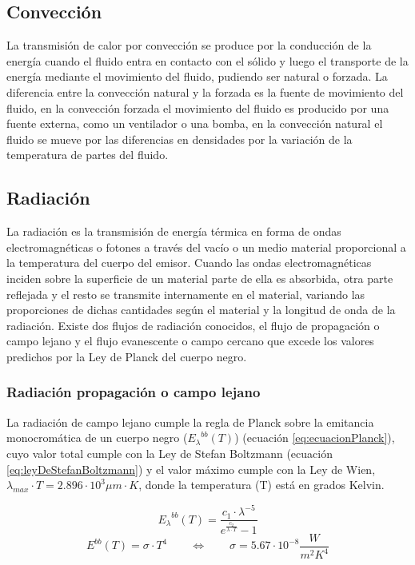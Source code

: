 \subsection{Convección}
La transmisión de calor por convección se produce por la conducción de la energía cuando el fluido entra en contacto con el sólido y luego el transporte de la energía mediante el movimiento del fluido, pudiendo ser natural o forzada. La diferencia entre la convección natural y la forzada es la fuente de movimiento del fluido, en la convección forzada el movimiento del fluido es producido por una fuente externa, como un ventilador o una bomba, en la convección natural el fluido se mueve por las diferencias en densidades por la variación de la temperatura de partes del fluido.\\
\subsection{Radiación}
La radiación es la transmisión de energía térmica en forma de ondas electromagnéticas o fotones a través del vacío o un medio material proporcional a la temperatura del cuerpo del emisor. Cuando las ondas electromagnéticas inciden sobre la superficie de un material parte de ella es absorbida, otra parte reflejada y el resto se transmite internamente en el material, variando las proporciones de dichas cantidades según el material y la longitud de onda de la radiación. Existe dos flujos de radiación conocidos, el flujo de propagación o campo lejano y el flujo evanescente o campo cercano que excede los valores predichos por la Ley de Planck del cuerpo negro.\\

\subsubsection{Radiación propagación o campo lejano}
La radiación de campo lejano cumple la regla de Planck sobre la emitancia monocromática de un cuerpo negro (${E_{\lambda}}^{bb}(T)$) (ecuación \ref{eq:ecuacionPlanck}), cuyo valor total cumple con la Ley de Stefan Boltzmann (ecuación \ref{eq:leyDeStefanBoltzmann}) y el valor máximo cumple con la Ley de Wien, $\lambda_{max}\cdot T=2.896\cdot 10^3 \mu m\cdot K$, donde la temperatura (T) está en grados Kelvin.

\begin{equation}
{E_\lambda}^{bb}\left( T \right) = \dfrac{c_1\cdot \lambda^{-5}}{e^{\frac{c_2}{\lambda \cdot T}}-1}
\label{eq:ecuacionPlanck}
\end{equation}
\begin{equation}
{E}^{bb}\left( T \right)=\sigma \cdot T^4 \qquad \Longleftrightarrow \qquad \sigma = 5.67\cdot 10^{-8} \dfrac{W}{m^2 K^4}
\label{eq:leyDeStefanBoltzmann}
\end{equation}

